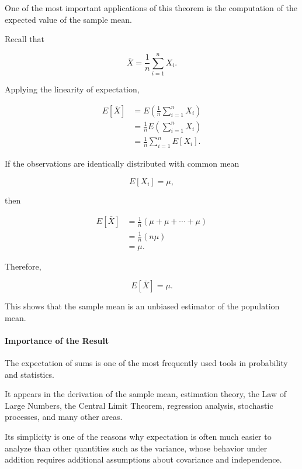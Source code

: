 \documentclass[11pt]{article}
\begin{document}
\begin{mdframed}[
		linewidth=0.8pt,
		roundcorner=6pt,
		backgroundcolor=gray!5,
		linecolor=gray!60,
		innertopmargin=10pt,
		innerbottommargin=10pt,
		innerleftmargin=10pt,
		innerrightmargin=10pt
		]
		One of the most important applications of this theorem is the computation
		of the expected value of the sample mean.
		
		Recall that
		
		\[
		\bar X
		=
		\frac1n
		\sum_{i=1}^{n}X_i.
		\]
		
		Applying the linearity of expectation,
		
		\[
		\begin{aligned}
			E[\bar X]
			&=
			E\!\left(
			\frac1n
			\sum_{i=1}^{n}X_i
			\right)
			\\[0.3cm]
			&=
			\frac1n
			E\!\left(
			\sum_{i=1}^{n}X_i
			\right)
			\\[0.3cm]
			&=
			\frac1n
			\sum_{i=1}^{n}
			E[X_i].
		\end{aligned}
		\]
		
		If the observations are identically distributed with common mean
		
		\[
		E[X_i]=\mu,
		\]
		
		then
		
		\[
		\begin{aligned}
			E[\bar X]
			&=
			\frac1n
			(\mu+\mu+\cdots+\mu)
			\\[0.3cm]
			&=
			\frac1n(n\mu)
			\\[0.3cm]
			&=
			\mu.
		\end{aligned}
		\]
		
		Therefore,
		
		\[
		\boxed{
			E[\bar X]=\mu.
		}
		\]
		
		This shows that the sample mean is an unbiased estimator of the population
		mean.
		
		\bigskip
		
		\paragraph{Importance of the Result}
		
		The expectation of sums is one of the most frequently used tools in
		probability and statistics.
		
		It appears in the derivation of the sample mean, estimation theory, the Law
		of Large Numbers, the Central Limit Theorem, regression analysis, stochastic
		processes, and many other areas.
		
		Its simplicity is one of the reasons why expectation is often much easier
		to analyze than other quantities such as the variance, whose behavior under
		addition requires additional assumptions about covariance and
		independence.
		
	\end{mdframed}
	
\end{document}
